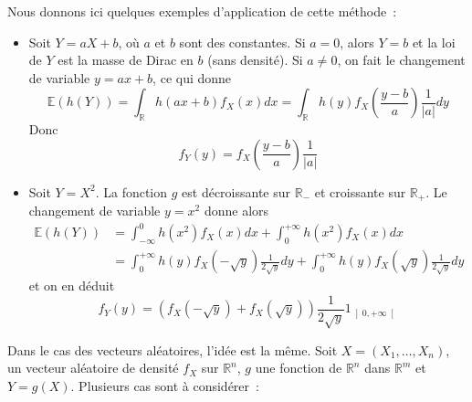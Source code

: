 Nous donnons ici quelques exemples d'application de cette méthode~:

\begin{itemize}
\tightlist
\item
  Soit \(Y = aX + b\), où \(a\) et \(b\) sont des constantes. Si
  \(a=0\), alors \(Y = b\) et la loi de \(Y\) est la masse de Dirac en
  \(b\) (sans densité). Si \(a \neq 0\), on fait le changement de
  variable \(y = ax+b\), ce qui donne
  \[ \mathbb{E}(h(Y)) = \int_\mathbb{R}h(ax+b) f_X(x) dx = \int_\mathbb{R}h(y) f_X(\frac{y-b}{a})\frac{1}{|a|} dy \]
  Donc \[ f_Y(y) = f_X(\frac{y-b}{a})\frac{1}{|a|} \]
\item
  Soit \(Y =X^2\). La fonction \(g\) est décroissante sur
  \(\mathbb{R}_-\) et croissante sur \(\mathbb{R}_+\). Le changement de
  variable \(y = x^2\) donne alors \begin{align*}
       \mathbb{E}(h(Y)) &= \int_{-\infty}^0 h(x^2) f_X(x) dx + \int_0^{+\infty} h(x^2) f_X(x) dx\\
                  &= \int_0^{+\infty} h(y) f_X(-\sqrt{y})\frac{1}{2\sqrt{y}} dy + \int_0^{+\infty} h(y) f_X(\sqrt{y})\frac{1}{2\sqrt{y}}dy
       \end{align*} et on en déduit
  \[f_Y(y) = (f_X(-\sqrt{y})+f_X(\sqrt{y}))\frac{1}{2\sqrt{y}}1_{\left]0,+\infty\right[}\]
\end{itemize}

Dans le cas des vecteurs aléatoires, l'idée est la même. Soit
\(X = (X_1,\ldots,X_n)\), un vecteur aléatoire de densité \(f_X\) sur
\(\mathbb{R}^n\), \(g\) une fonction de \(\mathbb{R}^n\) dans
\(\mathbb{R}^m\) et \(Y = g(X)\). Plusieurs cas sont à considérer~:

